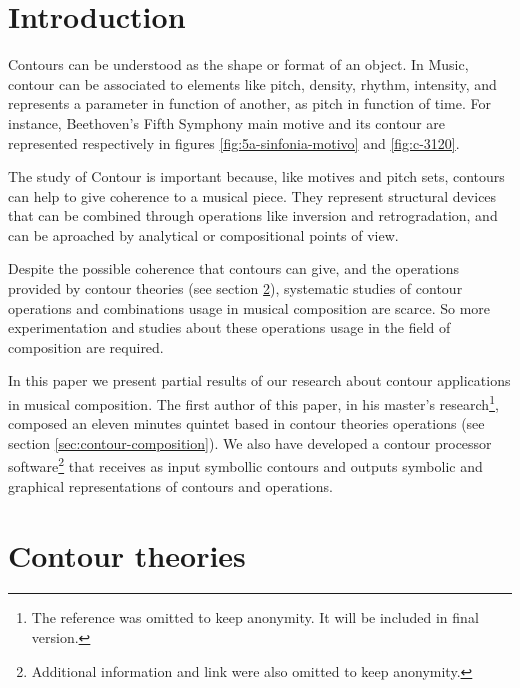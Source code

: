 

\section{Introduction}
\label{sec:introduction}

Contours can be understood as the shape or format of an object. In
Music, contour can be associated to elements like pitch, density,
rhythm, intensity, and represents a parameter in function of another,
as pitch in function of time. For instance, Beethoven's Fifth Symphony
main motive and its contour are represented respectively in figures
\ref{fig:5a-sinfonia-motivo} and \ref{fig:c-3120}.

The study of Contour is important because, like motives and pitch
sets, contours can help to give coherence to a musical piece. They
represent structural devices that can be combined through operations
like inversion and retrogradation, and can be aproached by analytical
or compositional points of view.

Despite the possible coherence that contours can give, and the
operations provided by contour theories (see section
\ref{sec:contour-theories}), systematic studies of contour operations
and combinations usage in musical composition are scarce. So more
experimentation and studies about these operations usage in the field
of composition are required.

In this paper we present partial results of our research about contour
applications in musical composition. The first author of this paper,
in his master's research\footnote{The reference was omitted to keep
  anonymity. It will be included in final version.}, composed an
eleven minutes quintet based in contour theories operations (see
section \ref{sec:contour-composition}). We also have developed a
contour processor software\footnote{Additional information and link
  were also omitted to keep anonymity.} that receives as input
symbollic contours and outputs symbolic and graphical representations
of contours and operations.

\section{Contour theories}
\label{sec:contour-theories}

